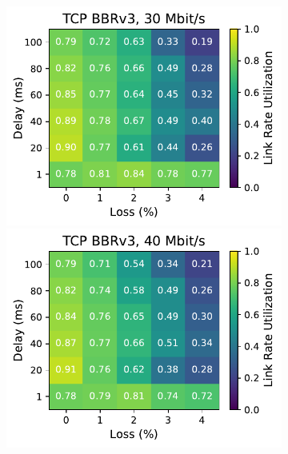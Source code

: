 \begin{figure}[ht]
\begin{subfigure}[b]{0.22\linewidth}
        \includegraphics[width=\linewidth,trim={0 0 2cm 0},clip]{splitting-paper/figures/heatmaps/heatmap_tcp_bbr3_30mbps.pdf}
        \includegraphics[width=\linewidth,trim={0 0 2cm 0},clip]{splitting-paper/figures/heatmaps/heatmap_tcp_bbr3_40mbps.pdf}

\end{subfigure}
\end{figure}
